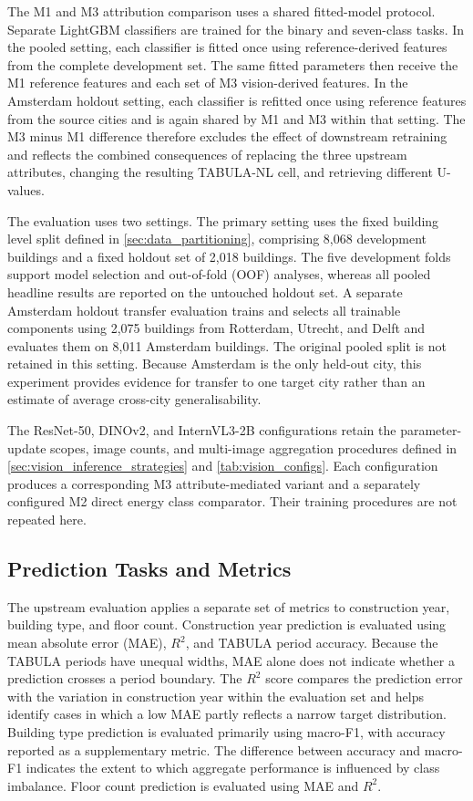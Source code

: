 The M1 and M3 attribution comparison uses a shared fitted-model protocol.
Separate LightGBM classifiers are trained for the binary and seven-class tasks.
In the pooled setting, each classifier is fitted once using reference-derived features from the complete development set.
The same fitted parameters then receive the M1 reference features and each set of M3 vision-derived features.
In the Amsterdam holdout setting, each classifier is refitted once using reference features from the source cities and is again shared by M1 and M3 within that setting.
The M3 minus M1 difference therefore excludes the effect of downstream retraining and reflects the combined consequences of replacing the three upstream attributes, changing the resulting TABULA-NL cell, and retrieving different U-values.

The evaluation uses two settings.
The primary setting uses the fixed building level split defined in \cref{sec:data_partitioning}, comprising 8,068 development buildings and a fixed holdout set of 2,018 buildings.
The five development folds support model selection and out-of-fold (OOF) analyses, whereas all pooled headline results are reported on the untouched holdout set.
A separate Amsterdam holdout transfer evaluation trains and selects all trainable components using 2,075 buildings from Rotterdam, Utrecht, and Delft and evaluates them on 8,011 Amsterdam buildings.
The original pooled split is not retained in this setting.
Because Amsterdam is the only held-out city, this experiment provides evidence for transfer to one target city rather than an estimate of average cross-city generalisability.

The ResNet-50, DINOv2, and InternVL3-2B configurations retain the parameter-update scopes, image counts, and multi-image aggregation procedures defined in \cref{sec:vision_inference_strategies} and \cref{tab:vision_configs}.
Each configuration produces a corresponding M3 attribute-mediated variant and a separately configured M2 direct energy class comparator.
Their training procedures are not repeated here.

\subsection{Prediction Tasks and Metrics}
\label{sec:prediction_tasks_metrics}

The upstream evaluation applies a separate set of metrics to construction year, building type, and floor count.
Construction year prediction is evaluated using mean absolute error (MAE), $R^2$, and TABULA period accuracy.
Because the TABULA periods have unequal widths, MAE alone does not indicate whether a prediction crosses a period boundary.
The $R^2$ score compares the prediction error with the variation in construction year within the evaluation set and helps identify cases in which a low MAE partly reflects a narrow target distribution.
Building type prediction is evaluated primarily using macro-F1, with accuracy reported as a supplementary metric.
The difference between accuracy and macro-F1 indicates the extent to which aggregate performance is influenced by class imbalance.
Floor count prediction is evaluated using MAE and $R^2$.

